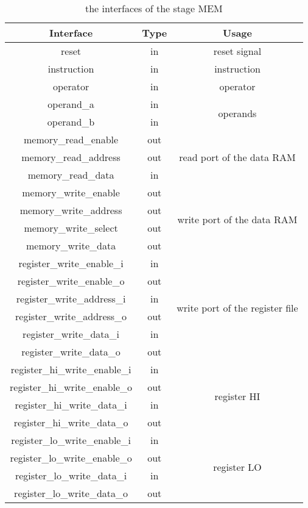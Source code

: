 \begin{table}[!h]
\centering
\begin{tabular}{ccc}
\toprule
Interface & Type & Usage \\ \midrule
reset & in & reset signal \\ \hline
instruction & in & instruction \\ \hline
operator & in & operator \\ \hline
operand\_a & in & \multirow{2}{*}{operands} \\ \cline{1-2}
operand\_b & in &  \\ \hline
memory\_read\_enable & out & \multirow{3}{*}{read port of the data RAM} \\ \cline{1-2}
memory\_read\_address & out &  \\ \cline{1-2}
memory\_read\_data & in &  \\ \hline
memory\_write\_enable & out & \multirow{4}{*}{write port of the data RAM} \\ \cline{1-2}
memory\_write\_address & out &  \\ \cline{1-2}
memory\_write\_select & out &  \\ \cline{1-2}
memory\_write\_data & out &  \\ \hline
register\_write\_enable\_i & in & \multirow{6}{*}{write port of the register file} \\ \cline{1-2}
register\_write\_enable\_o & out &  \\ \cline{1-2}
register\_write\_address\_i & in &  \\ \cline{1-2}
register\_write\_address\_o & out &  \\ \cline{1-2}
register\_write\_data\_i & in &  \\ \cline{1-2}
register\_write\_data\_o & out &  \\ \hline
register\_hi\_write\_enable\_i & in & \multirow{4}{*}{register HI} \\ \cline{1-2}
register\_hi\_write\_enable\_o & out &  \\ \cline{1-2}
register\_hi\_write\_data\_i & in &  \\ \cline{1-2}
register\_hi\_write\_data\_o & out &  \\ \hline
register\_lo\_write\_enable\_i & in & \multirow{4}{*}{register LO} \\ \cline{1-2}
register\_lo\_write\_enable\_o & out &  \\ \cline{1-2}
register\_lo\_write\_data\_i & in &  \\ \cline{1-2}
register\_lo\_write\_data\_o & out &  \\ \bottomrule
\end{tabular}
\caption{the interfaces of the stage MEM}
\end{table}